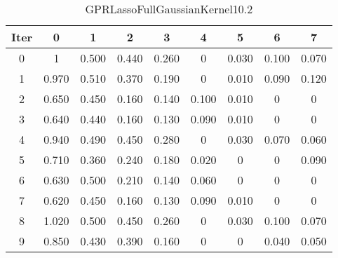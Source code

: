\begin{table}
	\begin{center}
		\begin{tabular}{|c|c|c|c|c|c|c|c|c|}
			\hline
			Iter & 0 & 1 & 2 & 3 & 4 & 5 & 6 & 7 \\
			\hline
			0 & 1 & 0.500 & 0.440 & 0.260 & 0 & 0.030 & 0.100 & 0.070 \\
			\hline
			1 & 0.970 & 0.510 & 0.370 & 0.190 & 0 & 0.010 & 0.090 & 0.120 \\
			\hline
			2 & 0.650 & 0.450 & 0.160 & 0.140 & 0.100 & 0.010 & 0 & 0 \\
			\hline
			3 & 0.640 & 0.440 & 0.160 & 0.130 & 0.090 & 0.010 & 0 & 0 \\
			\hline
			4 & 0.940 & 0.490 & 0.450 & 0.280 & 0 & 0.030 & 0.070 & 0.060 \\
			\hline
			5 & 0.710 & 0.360 & 0.240 & 0.180 & 0.020 & 0 & 0 & 0.090 \\
			\hline
			6 & 0.630 & 0.500 & 0.210 & 0.140 & 0.060 & 0 & 0 & 0 \\
			\hline
			7 & 0.620 & 0.450 & 0.160 & 0.130 & 0.090 & 0.010 & 0 & 0 \\
			\hline
			8 & 1.020 & 0.500 & 0.450 & 0.260 & 0 & 0.030 & 0.100 & 0.070 \\
			\hline
			9 & 0.850 & 0.430 & 0.390 & 0.160 & 0 & 0 & 0.040 & 0.050 \\
			\hline
		\end{tabular}
	\end{center}
	\caption{GPRLassoFullGaussianKernel10.2}
\end{table}